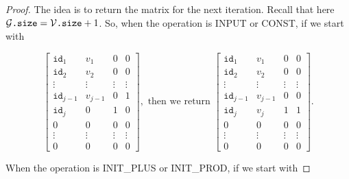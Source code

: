 \begin{proof}
    The idea is to return the matrix for the next iteration. Recall that here $\mathcal{G}\texttt{.size}=\mathcal{V}\texttt{.size} + 1$. So, when the operation is INPUT or CONST, if we start with

    \[
    \begin{bmatrix}
        \texttt{id}_1 & v_1 & 0 & 0 \\
        \texttt{id}_2 & v_2 & 0 & 0 \\
        \vdots & \vdots & \vdots & \vdots \\
        \texttt{id}_{j-1} & v_{j-1} & 0 & 1 \\
        \texttt{id}_j & 0 & 1 & 0 \\
        0 & 0 & 0 & 0 \\
        \vdots & \vdots & \vdots & \vdots \\
        0 & 0 & 0 & 0
    \end{bmatrix}, \text{ then we return }
    \begin{bmatrix}
        \texttt{id}_1 & v_1 & 0 & 0 \\
        \texttt{id}_2 & v_2 & 0 & 0 \\
        \vdots & \vdots & \vdots & \vdots \\
        \texttt{id}_{j-1} & v_{j-1} & 0 & 0 \\
        \texttt{id}_j & v_j & 1 & 1 \\
        0 & 0 & 0 & 0 \\
        \vdots & \vdots & \vdots & \vdots \\
        0 & 0 & 0 & 0
    \end{bmatrix}.
    \]

    When the operation is INIT{\_}PLUS or INIT{\_}PROD, if we start with 


\end{proof}

